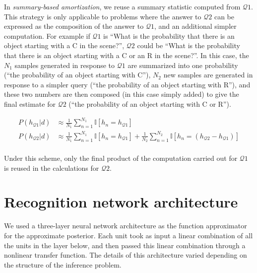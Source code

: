 In \emph{summary-based amortization}, we reuse a summary statistic computed from $\mathcal{Q}1$. This strategy is only applicable to problems where the answer to $\mathcal{Q}2$ can be expressed as the composition of the answer to $\mathcal{Q}1$, and an additional simpler computation. For example if $\mathcal{Q}1$ is ``What is the probability that there is an object starting with a C in the scene?'', $\mathcal{Q}2$ could be ``What is the probability that there is an object starting with a C or an R in the scene?''. In this case, the $N_1$ samples generated in response to $\mathcal{Q}1$ are summarized into one probability (``the probability of an object starting with C''), $N_2$ new samples are generated in response to a simpler query (``the probability of an object starting with R''), and these two numbers are then composed (in this case simply added) to give the final estimate for $\mathcal{Q}2$ (``the probability of an object starting with C or R''). 


\begin{align*}
\textstyle
P(h_{\mathcal{Q}1}|d) & \approx \frac{1}{N_1}\sum_{n=1}^{N_1} \mathbb{I}[h_n=h_{\mathcal{Q}1}]\\
P(h_{\mathcal{Q}2}|d) & \approx \frac{1}{N_1}\sum_{n=1}^{N_1} \mathbb{I}[h_n=h_{\mathcal{Q}1}] + \frac{1}{N_2}\sum_{n=1}^{N_2} \mathbb{I}[h_n= (h_{\mathcal{Q}2} - h_{\mathcal{Q}1})]\\
\end{align*}


Under this scheme, only the final product of the computation carried out for $\mathcal{Q}1$ is reused in the calculations for $\mathcal{Q}2$.


\section{Recognition network architecture}
\label{app:LTI_arch}

We used a three-layer neural network architecture as the function approximator for the approximate posterior. Each unit took as input a linear combination of all the units in the layer below, and then passed this linear combination through a nonlinear transfer function. The details of this architecture varied depending on the structure of the inference problem. 

